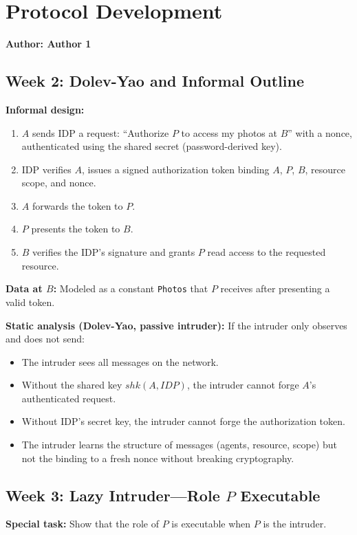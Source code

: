 \documentclass[11pt,a4paper]{article}
\begin{document}
\section{Protocol Development}
\textbf{Author: Author 1}

\subsection{Week 2: Dolev-Yao and Informal Outline}

\textbf{Informal design:}
\begin{enumerate}
  \item $A$ sends IDP a request: ``Authorize $P$ to access my photos at $B$'' with a nonce, authenticated using the shared secret (password-derived key).
  \item IDP verifies $A$, issues a signed authorization token binding $A$, $P$, $B$, resource scope, and nonce.
  \item $A$ forwards the token to $P$.
  \item $P$ presents the token to $B$.
  \item $B$ verifies the IDP's signature and grants $P$ read access to the requested resource.
\end{enumerate}

\textbf{Data at $B$:} Modeled as a constant \texttt{Photos} that $P$ receives after presenting a valid token.

\textbf{Static analysis (Dolev-Yao, passive intruder):} If the intruder only observes and does not send:
\begin{itemize}
  \item The intruder sees all messages on the network.
  \item Without the shared key $shk(A,\mathit{IDP})$, the intruder cannot forge $A$'s authenticated request.
  \item Without IDP's secret key, the intruder cannot forge the authorization token.
  \item The intruder learns the structure of messages (agents, resource, scope) but not the binding to a fresh nonce without breaking cryptography.
\end{itemize}

\subsection{Week 3: Lazy Intruder---Role $P$ Executable}

\textbf{Special task:} Show that the role of $P$ is executable when $P$ is the intruder.
\end{document}
